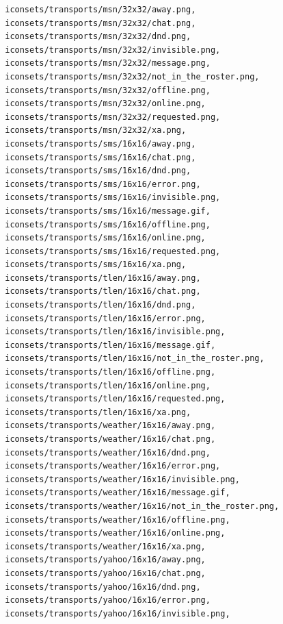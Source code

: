 \documentclass[a4paper]{article}
\begin{document}
\begin{verbatim}
              iconsets/transports/msn/32x32/away.png,
              iconsets/transports/msn/32x32/chat.png,
              iconsets/transports/msn/32x32/dnd.png,
              iconsets/transports/msn/32x32/invisible.png,
              iconsets/transports/msn/32x32/message.png,
              iconsets/transports/msn/32x32/not_in_the_roster.png,
              iconsets/transports/msn/32x32/offline.png,
              iconsets/transports/msn/32x32/online.png,
              iconsets/transports/msn/32x32/requested.png,
              iconsets/transports/msn/32x32/xa.png,
              iconsets/transports/sms/16x16/away.png,
              iconsets/transports/sms/16x16/chat.png,
              iconsets/transports/sms/16x16/dnd.png,
              iconsets/transports/sms/16x16/error.png,
              iconsets/transports/sms/16x16/invisible.png,
              iconsets/transports/sms/16x16/message.gif,
              iconsets/transports/sms/16x16/offline.png,
              iconsets/transports/sms/16x16/online.png,
              iconsets/transports/sms/16x16/requested.png,
              iconsets/transports/sms/16x16/xa.png,
              iconsets/transports/tlen/16x16/away.png,
              iconsets/transports/tlen/16x16/chat.png,
              iconsets/transports/tlen/16x16/dnd.png,
              iconsets/transports/tlen/16x16/error.png,
              iconsets/transports/tlen/16x16/invisible.png,
              iconsets/transports/tlen/16x16/message.gif,
              iconsets/transports/tlen/16x16/not_in_the_roster.png,
              iconsets/transports/tlen/16x16/offline.png,
              iconsets/transports/tlen/16x16/online.png,
              iconsets/transports/tlen/16x16/requested.png,
              iconsets/transports/tlen/16x16/xa.png,
              iconsets/transports/weather/16x16/away.png,
              iconsets/transports/weather/16x16/chat.png,
              iconsets/transports/weather/16x16/dnd.png,
              iconsets/transports/weather/16x16/error.png,
              iconsets/transports/weather/16x16/invisible.png,
              iconsets/transports/weather/16x16/message.gif,
              iconsets/transports/weather/16x16/not_in_the_roster.png,
              iconsets/transports/weather/16x16/offline.png,
              iconsets/transports/weather/16x16/online.png,
              iconsets/transports/weather/16x16/xa.png,
              iconsets/transports/yahoo/16x16/away.png,
              iconsets/transports/yahoo/16x16/chat.png,
              iconsets/transports/yahoo/16x16/dnd.png,
              iconsets/transports/yahoo/16x16/error.png,
              iconsets/transports/yahoo/16x16/invisible.png,

\end{verbatim}
\end{document}

